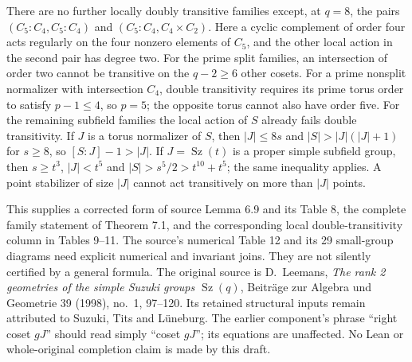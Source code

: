 \documentclass[11pt,a4paper]{article}
\newcommand{\Sz}{\operatorname{Sz}}
\begin{document}
There are no further locally doubly transitive families except,
at $q=8$, the pairs $(C_5\!:\!C_4,C_5\!:\!C_4)$ and
$(C_5\!:\!C_4,C_4\times C_2)$. Here a cyclic complement of
order four acts regularly on the four nonzero elements of $C_5$,
and the other local action in the second pair has degree two.
For the prime split families, an intersection of order two
cannot be transitive on the $q-2\ge6$ other cosets. For a prime
nonsplit normalizer with intersection $C_4$, double transitivity
requires its prime torus order to satisfy $p-1\le4$, so $p=5$;
the opposite torus cannot also have order five. For the remaining
subfield families the local action of $S$ already fails double
transitivity. If $J$ is a torus normalizer of $S$, then
$|J|\le8s$ and $|S|>|J|(|J|+1)$ for $s\ge8$, so
$[S:J]-1>|J|$. If $J=\Sz(t)$ is a proper simple subfield group,
then $s\ge t^3$, $|J|<t^5$ and $|S|>s^5/2>t^{10}+t^5$;
the same inequality applies. A point stabilizer of size $|J|$
cannot act transitively on more than $|J|$ points.

This supplies a corrected form of source Lemma 6.9 and its
Table 8, the complete family statement of Theorem 7.1, and
the corresponding local double-transitivity column in Tables
9--11. The source's numerical Table 12 and its 29 small-group
diagrams need explicit numerical and invariant joins. They
are not silently certified by a general formula. The original
source is D.~Leemans, \emph{The rank 2 geometries of the simple
Suzuki groups $\Sz(q)$}, Beitr\"age zur Algebra und Geometrie
39 (1998), no.~1, 97--120. Its retained structural inputs remain
attributed to Suzuki, Tits and L\"uneburg. The earlier component's
phrase ``right coset $gJ$'' should read simply ``coset $gJ$'';
its equations are unaffected. No Lean or whole-original completion
claim is made by this draft.
\end{document}
